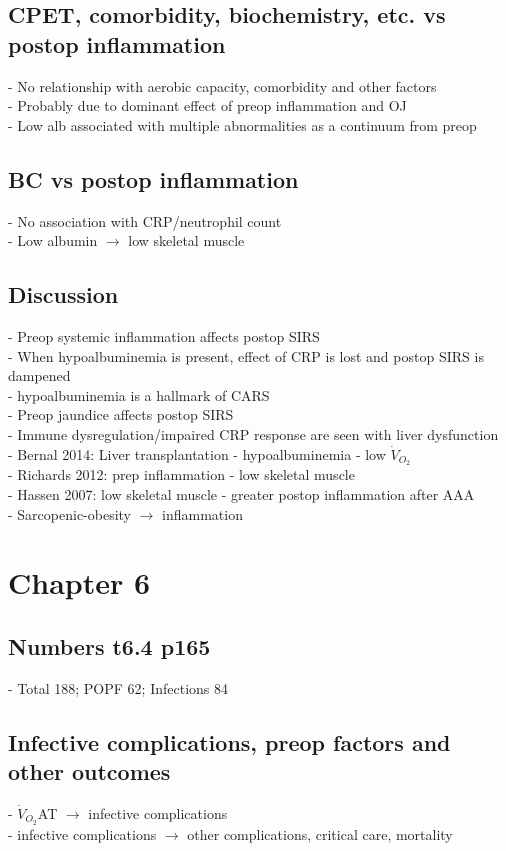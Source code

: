 \documentclass[12pt,a4paper]{article}
\begin{document}
\subsection{CPET, comorbidity, biochemistry, etc. vs postop inflammation}
- No relationship with aerobic capacity, comorbidity and other factors\\
- Probably due to dominant effect of preop inflammation and OJ\\
- Low alb associated with multiple abnormalities as a continuum from preop

\subsection{BC vs postop inflammation}
- No association with CRP/neutrophil count\\
- Low albumin $\rightarrow$ low skeletal muscle

\subsection{Discussion}
- Preop systemic inflammation affects postop SIRS\\
- When hypoalbuminemia is present, effect of CRP is lost and postop SIRS is dampened\\
- hypoalbuminemia is a hallmark of CARS\\
- Preop jaundice affects postop SIRS\\
- Immune dysregulation/impaired CRP response are seen with liver dysfunction\\
- Bernal 2014: Liver transplantation - hypoalbuminemia - low $\dot{V}_{O_2}$\\
- Richards 2012: prep inflammation - low  skeletal muscle\\
- Hassen 2007: low skeletal muscle - greater postop inflammation after AAA\\
- Sarcopenic-obesity $\rightarrow$ inflammation

\clearpage

\section{Chapter 6}

\subsection{Numbers t6.4 p165}
- Total 188; POPF 62; Infections 84
\subsection{Infective complications, preop factors and other outcomes}
- $\dot{V}_{O_2}$AT $\rightarrow$ infective complications\\
- infective complications $\rightarrow$ other complications, critical care, mortality
\end{document}
